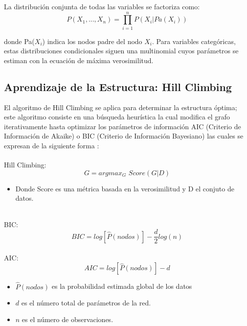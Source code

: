 \documentclass{ajceam-class}   %
\begin{document}
La distribución conjunta de todas las variables se factoriza como:
\begin{equation}
P(X_1, ..., X_n) = \prod_{i=1}^{n} P(X_i | Pa(X_i))
\label{eq:bayes_factor}
\end{equation}

donde Pa($X_i$) indica los nodos padre del nodo $X_i$. Para variables categóricas, estas distribuciones condicionales siguen una multinomial cuyos parámetros se estiman con la ecuación de máxima verosimilitud. \cite{CIMAT} \cite{html_M1}\cite{html_Prob}

\subsection{Aprendizaje de la Estructura: Hill Climbing}
El algoritmo de Hill Climbing se aplica para determinar la estructura óptima; este algoritmo consiste en una búsqueda heurística la cual modifica el grafo iterativamente hasta optimizar los parámetros de información AIC (Criterio de Información de Akaike) o BIC (Criterio de Información Bayesiano) las cuales se expresan de la siguiente forma \cite{html_Prob} \cite{CIMAT2}: \\
\\
Hill Climbing:
\begin{equation}
G = arg max_G\,\,Score(G|D)
\label{eq:Hill Climbing}
\end{equation}

 \begin{itemize}
     \item Donde Score es una métrica basada en la verosimilitud y D el conjuto de datos.
 \end{itemize}
\\
BIC:
\begin{equation}
BIC = log[\hat{P}(nodos)]-\frac{d}{2}log(n)
\label{eq:BIC}
\end{equation}
\\
AIC:
\begin{equation}
AIC = log[\hat{P}(nodos)]-d
\label{eq:AIC}
\end{equation}


 \begin{itemize}
     \item $\hat{P}(nodos)$ es la probabilidad estimada global de los datos
     \item $d$ es el número total de parámetros de la red.
     \item $n$ es el número de observaciones.
 \end{itemize}
\end{document}
